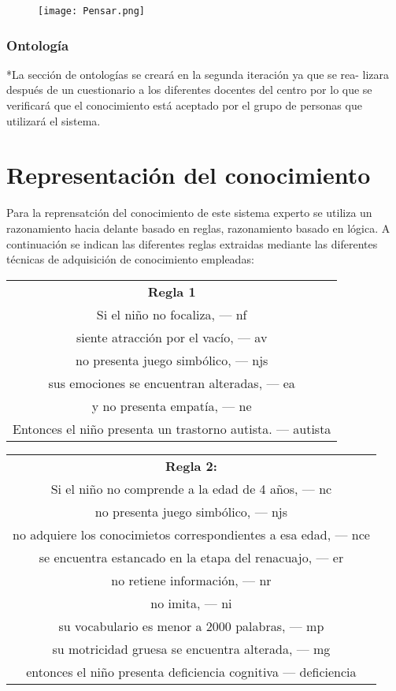 \documentclass[letterpaper,12pt]{article}
\begin{document}
\begin{figure}[htb]
				\begin{center}
					\texttt{[image: Pensar.png]}
				\end{center}
			\end{figure}
\subsubsection{Ontología}
*La sección de ontologías se creará en la segunda iteración ya que se rea-
lizara después de un cuestionario a los diferentes docentes del centro por lo que se verificará que el conocimiento está aceptado por el grupo de personas que utilizará el sistema.
\section{Representación del conocimiento}
Para la reprensatción del conocimiento de este sistema experto se utiliza
un razonamiento hacia delante basado en reglas, razonamiento basado en
lógica. A continuación se indican las diferentes reglas extraidas mediante las diferentes técnicas de adquisición de conocimiento empleadas: \\

\begin{center}
\begin{tabular}{|c|}
\hline 
\textbf{Regla 1} \\ 
Si el niño no focaliza, — nf \\
siente atracción por el vacío, — av \\
no presenta juego simbólico, — njs \\
sus emociones se encuentran alteradas, — ea \\
y no presenta empatía, — ne \\ 
Entonces el niño presenta un trastorno autista. — autista \\
\hline 
\end{tabular} 
\end{center}
\begin{center}
\begin{tabular}{|c|}
\hline 
 \textbf{Regla 2:} \\
Si el niño no comprende a la edad de 4 años, — nc \\
no presenta juego simbólico, — njs \\
no adquiere los conocimietos correspondientes a esa edad, — nce\\
se encuentra estancado en la etapa del renacuajo, — er\\
no retiene información, — nr \\
no imita, — ni \\
su vocabulario es menor a 2000 palabras, — mp \\
su motricidad gruesa se encuentra alterada, — mg \\
entonces el niño presenta deficiencia cognitiva — deficiencia\\ 
\hline 
\end{tabular} 
\end{center}
\end{document}
